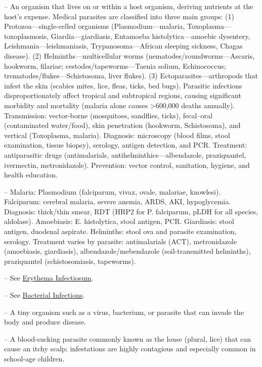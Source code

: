 -- An organism that lives on or within a host organism, deriving nutrients at the host's expense. Medical parasites are classified into three main groups: (1) Protozoa—single-celled organisms (Plasmodium—malaria, Toxoplasma—toxoplasmosis, Giardia—giardiasis, Entamoeba histolytica—amoebic dysentery, Leishmania—leishmaniasis, Trypanosoma—African sleeping sickness, Chagas disease). (2) Helminths—multicellular worms (nematodes/roundworms—Ascaris, hookworm, filariae; cestodes/tapeworms—Taenia solium, Echinococcus; trematodes/flukes—Schistosoma, liver flukes). (3) Ectoparasites—arthropods that infest the skin (scabies mites, lice, fleas, ticks, bed bugs). Parasitic infections disproportionately affect tropical and subtropical regions, causing significant morbidity and mortality (malaria alone causes >600,000 deaths annually). Transmission: vector-borne (mosquitoes, sandflies, ticks), fecal–oral (contaminated water/food), skin penetration (hookworm, Schistosoma), and vertical (Toxoplasma, malaria). Diagnosis: microscopy (blood films, stool examination, tissue biopsy), serology, antigen detection, and PCR. Treatment: antiparasitic drugs (antimalarials, antihelminthics—albendazole, praziquantel, ivermectin, metronidazole). Prevention: vector control, sanitation, hygiene, and health education.

-- Malaria: Plasmodium (falciparum, vivax, ovale, malariae, knowlesi). Falciparum: cerebral malaria, severe anemia, ARDS, AKI, hypoglycemia. Diagnosis: thick/thin smear, RDT (HRP2 for P. falciparum, pLDH for all species, aldolase). Amoebiasis: E. histolytica, stool antigen, PCR. Giardiasis: stool antigen, duodenal aspirate. Helminths: stool ova and parasite examination, serology. Treatment varies by parasite: antimalarials (ACT), metronidazole (amoebiasis, giardiasis), albendazole/mebendazole (soil-transmitted helminths), praziquantel (schistosomiasis, tapeworms).

-- See \hyperlink{Erythema Infectiosum}{Erythema Infectiosum}.

-- See \hyperlink{Bacterial Infections}{Bacterial Infections}.

-- A tiny organism such as a virus, bacterium, or parasite that can invade the body and produce disease.

-- A blood-sucking parasite commonly known as the louse (plural, lice) that can cause an itchy scalp; infestations are highly contagious and especially common in school-age children.

